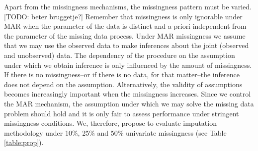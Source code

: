 \documentclass[bimj,fleqn]{w-art}
\begin{document}
Apart from the missingness mechanisms, the missingness pattern must be varied. [TODO: beter bruggetje?] Remember that missingness is only ignorable under MAR when the parameter of the data is distinct and a-priori independent from the parameter of the missing data process. Under MAR missingness we assume that we may use the observed data to make inferences about the joint (observed and unobserved) data. The dependency of the procedure on the assumption under which we obtain inference is only influenced by the amount of missingness. If there is no missingness--or if there is no data, for that matter--the inference does not depend on the assumption. Alternatively, the validity of assumptions becomes increasingly important when the missingness increases. Since we control the MAR mechanism, the assumption under which we may solve the missing data problem should hold and it is only fair to assess performance under stringent missingness conditions. We, therefore, propose to evaluate imputation methodology under 10\%, 25\% and 50\% univariate missingness (see Table \ref{table:prop}). %
\end{document}
